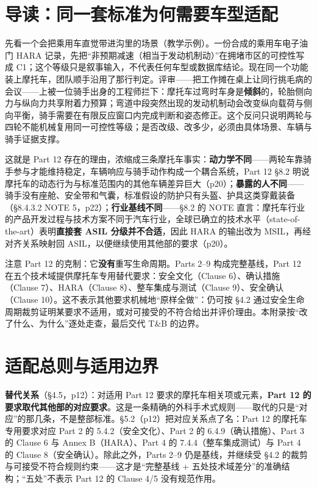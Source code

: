 \section{导读：同一套标准为何需要车型适配}

先看一个会把乘用车直觉带进沟里的场景（教学示例）。一份合成的乘用车电子油门 HARA 记录，先把“非预期减速（相当于发动机制动）”在拥堵市区的可控性写成 C1；这个等级只是叙事输入，不代表任何车型或数据库结论。现在同一个功能装上摩托车，团队顺手沿用了那行判定。评审——把工作摊在桌上让同行挑毛病的会议——上被一位骑手出身的工程师拦下：摩托车过弯时车身是\textbf{倾斜}的，轮胎侧向力与纵向力共享附着力预算；弯道中段突然出现的发动机制动会改变纵向载荷与侧向平衡，骑手需要在有限反应窗口内完成判断和姿态修正。这个反问只说明两轮与四轮不能机械复用同一可控性等级；是否改级、改多少，必须由具体场景、车辆与骑手证据支撑。

这就是 Part 12 存在的理由，浓缩成三条摩托车事实：\textbf{动力学不同}——两轮车靠骑手参与才能维持稳定，车辆响应与骑手动作构成一个耦合系统，Part 12 §8.2 明说摩托车的动态行为与标准范围内的其他车辆差异巨大（p20）；\textbf{暴露的人不同}——骑手没有座舱、安全带和气囊，标准假设的防护只有头盔、护具这类穿戴装备（§8.4.3.2 NOTE 5，p22）；\textbf{行业基线不同}——§8.2 的 NOTE 直言：摩托车行业的产品开发过程与技术方案不同于汽车行业，全球已确立的技术水平（state-of-the-art）表明\textbf{直接套 ASIL 分级并不合适}，因此 HARA 的输出改为 MSIL，再经对齐关系映射回 ASIL，以便继续使用其他部的要求（p20）。

注意 Part 12 的克制：它\textbf{没有}重写生命周期。Parts 2–9 构成完整基线，Part 12 在五个技术域提供摩托车专用替代要求：安全文化（Clause 6）、确认措施（Clause 7）、HARA（Clause 8）、整车集成与测试（Clause 9）、安全确认（Clause 10）。这不表示其他要求机械地“原样全做”：仍可按 §4.2 通过安全生命周期裁剪证明某要求不适用，或对可接受的不符合给出并评价理由。本附录按“改了什么、为什么”逐处走查，最后交代 T\&B 的边界。

\section{适配总则与适用边界}

\textbf{替代关系}（§4.5，p12）：对适用 Part 12 要求的摩托车相关项或元素，\textbf{Part 12 的要求取代其他部的对应要求}。这是一条精确的外科手术式规则——取代的只是“对应”的那几条，不是整部标准。§5.2（p12）把对应关系点了名：Part 12 的摩托车专用要求对应 Part 2 的 5.4.2（安全文化）、Part 2 的 6.4.9（确认措施）、Part 3 的 Clause 6 与 Annex B（HARA）、Part 4 的 7.4.4（整车集成测试）与 Part 4 的 Clause 8（安全确认）。除此之外，Parts 2–9 仍是基线，并继续受 §4.2 的裁剪与可接受不符合规则约束——这才是“完整基线 + 五处技术域差分”的准确结构；“五处”不表示 Part 12 的 Clause 4/5 没有规范作用。

